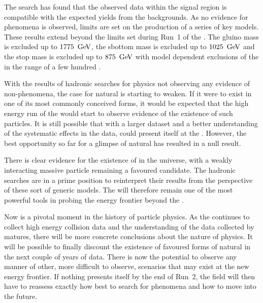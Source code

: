 The search has found that the observed data within the signal region
is compatible with the expected yields from the \SM backgrounds. As no
evidence for \BSM phenomena is observed, limits are set on the
production of a series of key \SUSY models. These results extend
beyond the limits set during Run~1 of the \LHC. The gluino mass is
excluded up to $1775~\mathrm{\,Ge\kern -0.1em V}$, the sbottom mass is excluded up to
$1025~\mathrm{\,Ge\kern -0.1em V}$ and the stop mass is excluded up to $875~\mathrm{\,Ge\kern -0.1em V}$ with model
dependent exclusions of the \LSP in the range of a few hundred \gev.

With the results of hadronic searches for \BSM physics not observing
any evidence of non-\SM phenomena, the case for natural \SUSY is
starting to weaken. If it were to exist in one of its most commonly
conceived forms, it would be expected that the high energy run of the
\LHC would start to observe evidence of the existence of such \SUSY
particles. It is still possible that with a larger dataset and a
better understanding of the systematic effects in the data, \SUSY could present
itself at the \LHC. However, the best opportunity so far for a glimpse of
natural \SUSY has resulted in a null result. 

There is clear evidence for the existence of \DM in the universe, with
a weakly interacting massive particle remaining a favoured candidate.
The hadronic \SUSY searches are in a prime position to reinterpret
their results from the perspective of these sort of generic \DM
models. The \LHC will therefore remain one of the most powerful tools
in probing the energy frontier beyond the \SM.

Now is a pivotal moment in the history of particle physics. As the
\LHC continues to collect high energy collision data and the
understanding of the data collected by \CMS matures, there will be
more concrete conclusions about the nature of \BSM physics.  It will
be possible to finally discount the existence of favoured forms of
natural \SUSY in the next couple of years of \LHC data. There is now
the potential to observe any manner of other, more difficult to observe,
\BSM scenarios that may exist at the new energy frontier. If nothing
presents itself by the end of Run~2, the field will then have to
reassess exactly how best to search for \BSM phenomena and how to move
into the future.

